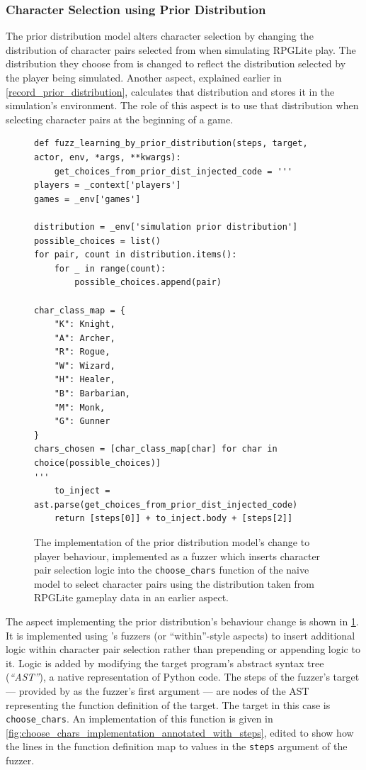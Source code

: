 \subsubsection{Character Selection using Prior Distribution}
\label{prior_distribution_aspect_description}

The prior distribution model alters character selection by changing the
distribution of character pairs selected from when simulating RPGLite play. The
distribution they choose from is changed to reflect the distribution selected by
the player being simulated. Another aspect, explained earlier in
\cref{record_prior_distribution}, calculates that distribution and stores it in
the simulation's environment. The role of this aspect is to use that
distribution when selecting character pairs at the beginning of a game.

\begin{figure}[hp]
  \centering
  \begin{lstlisting}
def fuzz_learning_by_prior_distribution(steps, target, actor, env, *args, **kwargs):
    get_choices_from_prior_dist_injected_code = '''
players = _context['players']
games = _env['games']

distribution = _env['simulation prior distribution']
possible_choices = list()
for pair, count in distribution.items():
    for _ in range(count):
        possible_choices.append(pair)

char_class_map = {
    "K": Knight,
    "A": Archer,
    "R": Rogue,
    "W": Wizard,
    "H": Healer,
    "B": Barbarian,
    "M": Monk,
    "G": Gunner
}
chars_chosen = [char_class_map[char] for char in choice(possible_choices)]
'''
    to_inject = ast.parse(get_choices_from_prior_dist_injected_code)
    return [steps[0]] + to_inject.body + [steps[2]]
  \end{lstlisting}
  \caption{The implementation of the prior distribution model's change to player
  behaviour, implemented as a \pdsf{} fuzzer which inserts character pair
  selection logic into the \lstinline{choose_chars} function of the naive model
  to select character pairs using the distribution taken from RPGLite gameplay
  data in an earlier aspect.}
  \label{fig:prior_distribution_implementation}
\end{figure}


The aspect implementing the prior distribution's behaviour change is shown in
\cref{fig:prior_distribution_implementation}. It is implemented using \pdsf{}'s
fuzzers (or ``within''-style aspects) to insert additional logic within
character pair selection rather than prepending or appending logic to it. Logic
is added by modifying the target program's abstract syntax tree (\emph{``AST''}),
a native representation of Python code. The steps of the fuzzer's target ---
provided by \pdsf{} as the fuzzer's first argument --- are nodes of the AST
representing the function definition of the target. The target in this case is
\lstinline{choose_chars}. An implementation of this function is given in
\cref{fig:choose_chars_implementation_annotated_with_steps}, edited to show how
the lines in the function definition map to values in the \lstinline{steps}
argument of the fuzzer.

